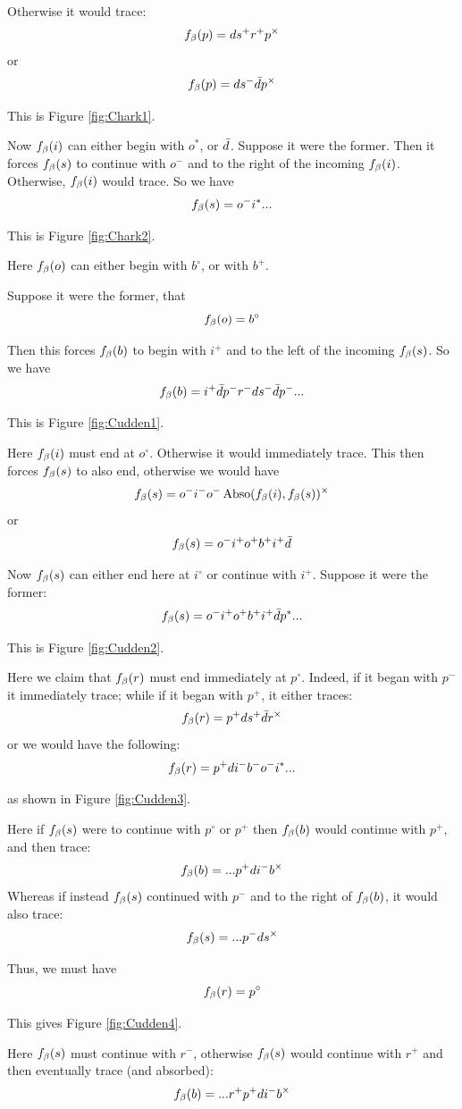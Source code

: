 Otherwise it would trace:
\[
f_\beta(p) = d s^+ r^+ p^\times
\]
or
\[
f_\beta(p) = d s^- \bar{d} p^\times
\]

This is Figure \ref{fig:Chark1}.

Now $f_\beta(i)$ can either begin with $o^*$, or $\bar{d}$. Suppose it were the former. Then it forces $f_\beta(s)$ to continue with $o^-$ and to the right of the incoming $f_\beta(i)$. Otherwise, $f_\beta(i)$ would trace. So we have
\[
f_\beta(s) = o^- i^*...
\]

This is Figure \ref{fig:Chark2}.

Here $f_\beta(o)$ can either begin with $b^\circ$, or with $b^+$.

\label{Cudden}
Suppose it were the former, that
\[
f_\beta(o) = b^\circ
\]

Then this forces $f_\beta(b)$ to begin with $i^+$ and to the left of the incoming $f_\beta(s)$. So we have
\[
f_\beta(b) = i^+ \bar{d} p^- r^- d s^- \bar{d} p^-...
\]

This is Figure \ref{fig:Cudden1}.

Here $f_\beta(i)$ must end at $o^\circ$. Otherwise it would immediately trace. This then forces $f_\beta(s)$ to also end, otherwise we would have
\[
f_\beta(s) = o^- i^- o^- \operatorname{Abso}(f_\beta(i), f_\beta(s))^\times
\]
or
\[
f_\beta(s) = o^- i^+ o^+ b^+ i^+ \bar{d} 
\]

Now $f_\beta(s)$ can either end here at $i^\circ$ or continue with $i^+$. Suppose it were the former:
\[
f_\beta(s) = o^- i^+ o^+ b^+ i^+ \bar{d} p^*...
\]

This is Figure \ref{fig:Cudden2}.

Here we claim that $f_\beta(r)$ must end immediately at $p^\circ$. Indeed, if it began with $p^-$ it immediately trace; while if it began with $p^+$, it either traces:
\[
f_\beta(r) = p^+ d s^+ \bar{d} r^\times
\]
or we would have the following:\[
f_\beta(r) = p^+ d i^- b^- o^- i^*...
\]

as shown in Figure \ref{fig:Cudden3}.

Here if $f_\beta(s)$ were to continue with $p^\circ$ or $p^+$ then $f_\beta(b)$ would continue with $p^+$, and then trace:
\[
f_\beta(b) = ...p^+ d i^- b^\times
\]
Whereas if instead $f_\beta(s)$ continued with $p^-$ and to the right of $f_\beta(b)$, it would also trace:
\[
f_\beta(s) = ...p^- d s^\times
\]

Thus, we must have
\[
f_\beta(r) = p^\circ
\]

This gives Figure \ref{fig:Cudden4}.

Here $f_\beta(s)$ must continue with $r^-$, otherwise $f_\beta(s)$ would continue with $r^+ $ and then eventually trace (and absorbed):
\[
f_\beta(b) = ...r^+ p^+ d i^- b^\times
\]

